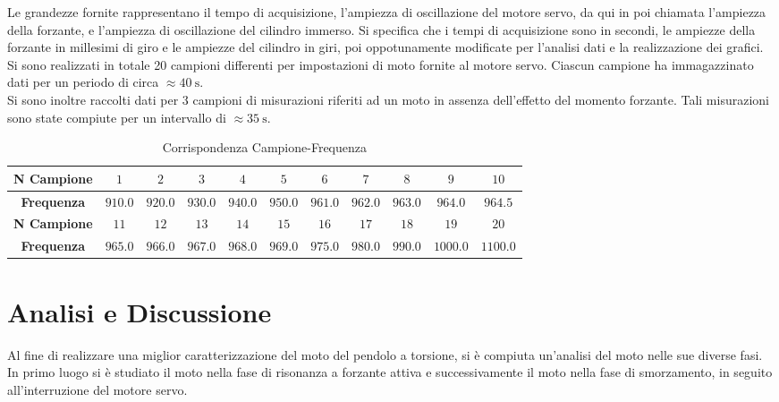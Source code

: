 \documentclass[a4paper,11pt,oneside]{article}
\begin{document}
Le grandezze fornite rappresentano il tempo di acquisizione, l'ampiezza di oscillazione del motore servo, da qui in poi chiamata l'ampiezza della forzante, e l'ampiezza di oscillazione del cilindro immerso. Si specifica che i tempi di acquisizione sono in secondi, le ampiezze della forzante in millesimi di giro e le ampiezze del cilindro in giri, poi oppotunamente modificate per l'analisi dati e la realizzazione dei grafici.\\
Si sono realizzati in totale 20 campioni differenti per impostazioni di moto fornite al  motore servo. Ciascun campione ha immagazzinato dati per un periodo di circa $\approx \SI{40}{\second}$.\\
Si sono inoltre raccolti dati per 3 campioni di misurazioni riferiti ad un moto in assenza dell'effetto del momento forzante. Tali misurazioni sono state compiute per un intervallo di $\approx  \SI{35}{\second}$.


\begin{table}[h!]
    \centering
    \begin{tabular}{|c|c|c|c|c|c|c|c|c|c|c|}
        \hline
        \textbf{N Campione} & $1$ & $2$ & $3$ & $4$ & $5$ & $6$ & $7$ & $8$ & $9$ & $10$ \\ \hline
        \textbf{Frequenza} & $910.0$ & $920.0$ & $930.0$ & $940.0$ & $950.0$ & $961.0$ & $962.0$ & $963.0$ & $964.0$ & $964.5$\\ \hline \hline
        \textbf{N Campione} & $11$ & $12$ & $13$ & $14$ & $15$ & $16$ & $17$ & $18$ & $19$ & $20$\\ \hline
        \textbf{Frequenza} & $965.0$ & $966.0$ & $967.0$ & $968.0$ & $969.0$ & $975.0$ & $980.0$ & $990.0$ & $1000.0$ & $1100.0$\\ \hline
    \end{tabular}
    \caption{Corrispondenza Campione-Frequenza}
    \label{tab:corrispondenza_campione_frequenza}
\end{table}


\section{Analisi e Discussione}
Al fine di realizzare una miglior caratterizzazione del moto del pendolo a torsione, si è compiuta un'analisi del moto nelle sue diverse fasi.\\
In primo luogo si è studiato il moto nella fase di risonanza a forzante attiva e successivamente il moto nella fase di smorzamento, in seguito all'interruzione del motore servo.
\end{document}
